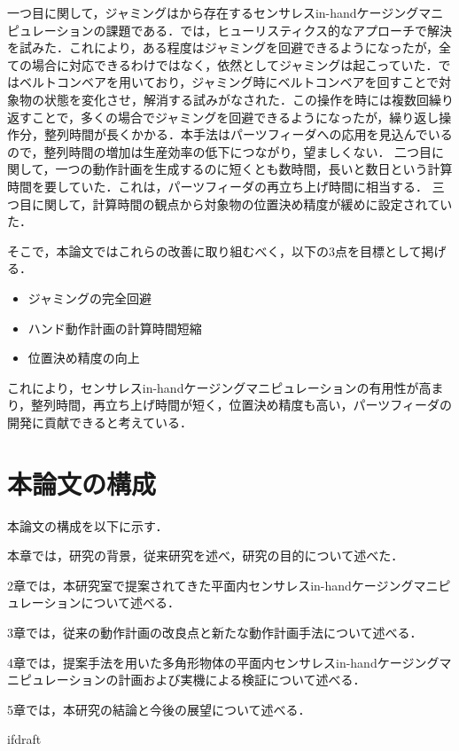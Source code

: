 \documentclass[a4paper,twoside,12pt,papersize, dvipdfmx]{iirthesis}
\begin{document}
一つ目に関して，ジャミングは\cite{asamura2013}から存在するセンサレスin-handケージングマニピュレーションの課題である．\cite{komiyama2020}では，ヒューリスティクス的なアプローチで解決を試みた．これにより，ある程度はジャミングを回避できるようになったが，全ての場合に対応できるわけではなく，依然としてジャミングは起こっていた．\cite{kamikukita2021}ではベルトコンベアを用いており，ジャミング時にベルトコンベアを回すことで対象物の状態を変化させ，解消する試みがなされた．この操作を時には複数回繰り返すことで，多くの場合でジャミングを回避できるようになったが，繰り返し操作分，整列時間が長くかかる．本手法はパーツフィーダへの応用を見込んでいるので，整列時間の増加は生産効率の低下につながり，望ましくない．
二つ目に関して，一つの動作計画を生成するのに短くとも数時間，長いと数日という計算時間を要していた．これは，パーツフィーダの再立ち上げ時間に相当する．
三つ目に関して，計算時間の観点から対象物の位置決め精度が緩めに設定されていた．\par

そこで，本論文ではこれらの改善に取り組むべく，以下の3点を目標として掲げる．
\begin{itemize}
\item ジャミングの完全回避
\item ハンド動作計画の計算時間短縮
\item 位置決め精度の向上
\end{itemize}
これにより，センサレスin-handケージングマニピュレーションの有用性が高まり，整列時間，再立ち上げ時間が短く，位置決め精度も高い，パーツフィーダの開発に貢献できると考えている．

\section{本論文の構成}\label{sec::intro::configuration}
本論文の構成を以下に示す．\par
本章では，研究の背景，従来研究を述べ，研究の目的について述べた．\par
2章では，本研究室で提案されてきた平面内センサレスin-handケージングマニピュレーションについて述べる．\par
3章では，従来の動作計画の改良点と新たな動作計画手法について述べる．\par
4章では，提案手法を用いた多角形物体の平面内センサレスin-handケージングマニピュレーションの計画および実機による検証について述べる．\par
5章では，本研究の結論と今後の展望について述べる．


\expandafter\ifx\csname ifdraft\endcsname\relax
    
\end{document}
